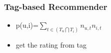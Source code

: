 \documentclass{beamer}
\begin{document}
\begin{frame}
  \frametitle{Tag-based Recommender}

  \begin{itemize}
  \item p(u,i)=$\sum_{t\in (T_{u} \bigcap T_{i})} n_{u,t}n_{i,t}$
    \pause
  \item get the rating from tag
  \end{itemize}


\end{frame}











\end{document}
